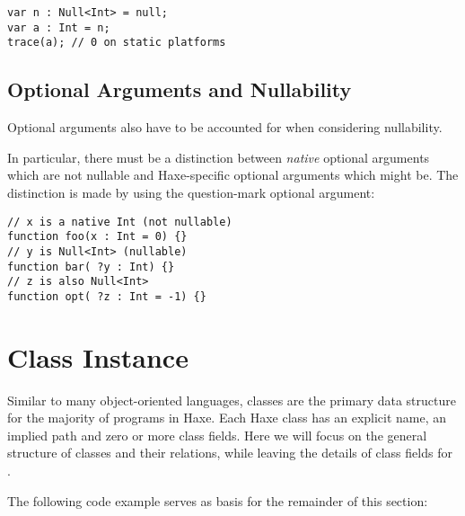 \begin{lstlisting}
var n : Null<Int> = null;
var a : Int = n;
trace(a); // 0 on static platforms
\end{lstlisting}



\subsection{Optional Arguments and Nullability}
\label{types-nullability-optional-arguments}

Optional arguments also have to be accounted for when considering nullability.

In particular, there must be a distinction between \emph{native} optional arguments which are not nullable and Haxe-specific optional arguments which might be. The distinction is made by using the question-mark optional argument:

\begin{lstlisting}
// x is a native Int (not nullable)
function foo(x : Int = 0) {}
// y is Null<Int> (nullable)
function bar( ?y : Int) {}
// z is also Null<Int>
function opt( ?z : Int = -1) {}
\end{lstlisting}


\section{Class Instance}
\label{types-class-instance}

Similar to many object-oriented languages, classes are the primary data structure for the majority of programs in Haxe. Each Haxe class has an explicit name, an implied path and zero or more class fields. Here we will focus on the general structure of classes and their relations, while leaving the details of class fields for .

The following code example serves as basis for the remainder of this section:

